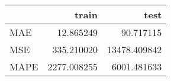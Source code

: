 \begin{tabular}{lrr}
\toprule
{} &        train &          test \\
\midrule
MAE  &    12.865249 &     90.717115 \\
MSE  &   335.210020 &  13478.409842 \\
MAPE &  2277.008255 &   6001.481633 \\
\bottomrule
\end{tabular}
